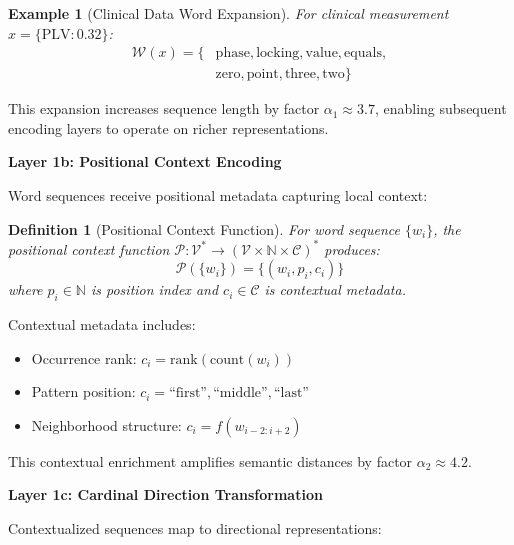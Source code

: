 \documentclass[12pt,a4paper]{article}
\newtheorem{definition}{Definition}
\newtheorem{example}{Example}
\begin{document}
\begin{example}[Clinical Data Word Expansion]
For clinical measurement $x = \{\text{PLV}: 0.32\}$:
\begin{align}
\mathcal{W}(x) = \{&\text{phase}, \text{locking}, \text{value}, \text{equals}, \\
&\text{zero}, \text{point}, \text{three}, \text{two}\}
\end{align}
\end{example}

This expansion increases sequence length by factor $\alpha_1 \approx 3.7$, enabling subsequent encoding layers to operate on richer representations.

\textbf{Layer 1b: Positional Context Encoding}

Word sequences receive positional metadata capturing local context:

\begin{definition}[Positional Context Function]
For word sequence $\{w_i\}$, the positional context function $\mathcal{P}: \mathcal{V}^* \to (\mathcal{V} \times \mathbb{N} \times \mathcal{C})^*$ produces:
\begin{equation}
\mathcal{P}(\{w_i\}) = \{(w_i, p_i, c_i)\}
\end{equation}
where $p_i \in \mathbb{N}$ is position index and $c_i \in \mathcal{C}$ is contextual metadata.
\end{definition}

Contextual metadata includes:
\begin{itemize}
\item Occurrence rank: $c_i = \text{rank}(\text{count}(w_i))$
\item Pattern position: $c_i = \text{``first''}, \text{``middle''}, \text{``last''}$
\item Neighborhood structure: $c_i = f(w_{i-2:i+2})$
\end{itemize}

This contextual enrichment amplifies semantic distances by factor $\alpha_2 \approx 4.2$.

\textbf{Layer 1c: Cardinal Direction Transformation}

Contextualized sequences map to directional representations:
\end{document}
